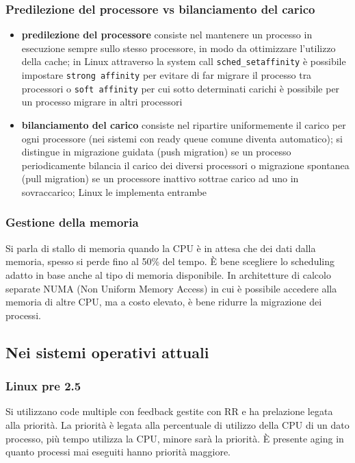 \documentclass[a4paper]{article}
\begin{document}
\subsubsection*{Predilezione del processore vs bilanciamento del carico}
\begin{itemize}
	\item \textbf{predilezione del processore} consiste nel mantenere un processo in esecuzione sempre sullo stesso processore,
	in modo da ottimizzare l'utilizzo della cache; in Linux attraverso la system call \verb|sched_setaffinity| è possibile
	impostare \verb|strong affinity| per evitare di far migrare il processo tra processori o \verb|soft affinity| per cui sotto
	determinati carichi è possibile per un processo migrare in altri processori
	\item \textbf{bilanciamento del carico} consiste nel ripartire uniformemente il carico per ogni processore (nei sistemi
	con ready queue comune diventa automatico); si distingue in migrazione guidata (push migration) se un processo periodicamente
	bilancia il carico dei diversi processori o migrazione spontanea (pull migration) se un processore inattivo sottrae carico
	ad uno in sovraccarico; Linux le implementa entrambe
\end{itemize}

\subsubsection*{Gestione della memoria}
Si parla di stallo di memoria quando la CPU è in attesa che dei dati dalla memoria, spesso si perde fino al 50\% del tempo. È bene
scegliere lo scheduling adatto in base anche al tipo di memoria disponibile. In architetture di calcolo separate NUMA (Non Uniform
Memory Access) in cui è possibile accedere alla memoria di altre CPU, ma a costo elevato, è bene ridurre la migrazione dei processi.

\subsection{Nei sistemi operativi attuali}
\subsubsection*{Linux pre 2.5}
Si utilizzano code multiple con feedback gestite con RR e ha prelazione legata alla priorità. La priorità è legata alla
percentuale di utilizzo della CPU di un dato processo, più tempo utilizza la CPU, minore sarà la priorità. È presente aging
in quanto processi mai eseguiti hanno priorità maggiore.
\end{document}
